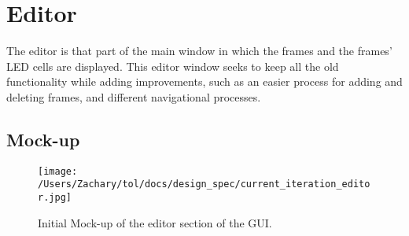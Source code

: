 \documentclass{article}
\begin{document}
	\section{Editor}
	The editor is that part of the main window in which the frames and the frames' LED cells are displayed.  This editor window seeks to keep all the old functionality while adding improvements, such as an easier process for adding and deleting frames, and different navigational  processes.
	\subsection{Mock-up}
	\begin{figure}[!htb]
		\texttt{[image: /Users/Zachary/tol/docs/design\_spec/current\_iteration\_editor.jpg]}
		\caption{Initial Mock-up of the editor section of the GUI.}
		\label{fig:editor_view}
	\end{figure}
	
\end{document}
